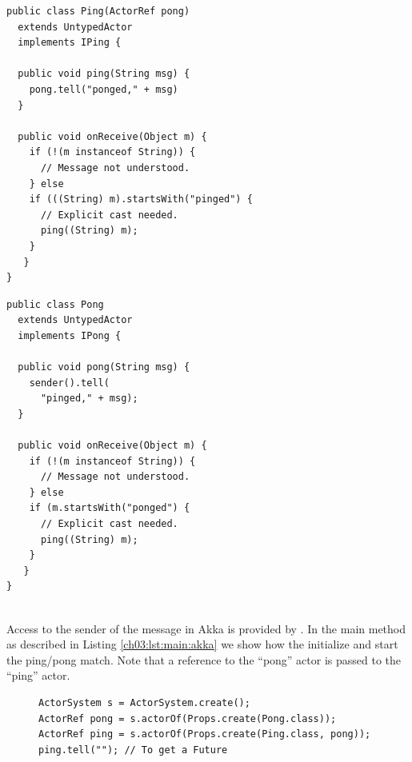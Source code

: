\lstset{language=Java}
\begin{center}
\begin{minipage}[t]{0.48\textwidth}
\begin{lstlisting}[caption=Ping actor in Akka,label=ch03:lst:ping:akka]
public class Ping(ActorRef pong)
  extends UntypedActor 
  implements IPing {

  public void ping(String msg) {
    pong.tell("ponged," + msg)
  }

  public void onReceive(Object m) {
    if (!(m instanceof String)) {
      // Message not understood.
    } else 
    if (((String) m).startsWith("pinged") {
      // Explicit cast needed.
      ping((String) m);
    } 
   }
}
\end{lstlisting}
\end{minipage}
\hfill
\begin{minipage}[t]{0.48\textwidth}
\begin{lstlisting}[caption=Pong class in Akka,label=ch03:lst:pong:akka]
public class Pong 
  extends UntypedActor 
  implements IPong {

  public void pong(String msg) {
    sender().tell(
      "pinged," + msg); 
  }

  public void onReceive(Object m) {
    if (!(m instanceof String)) {
      // Message not understood.
    } else 
    if (m.startsWith("ponged") {
      // Explicit cast needed.
      ping((String) m);
    } 
   }
}
 
\end{lstlisting}
\end{minipage}
\end{center}

Access to the sender of the message in Akka is provided by .
In the main method as described in Listing \ref{ch03:lst:main:akka} we show how the initialize and start the ping/pong match.
Note that a reference to the ``pong'' actor is passed to the ``ping'' actor.

\begin{figure}[h]
\begin{lstlisting}[caption=main in Akka,label=ch03:lst:main:akka]
ActorSystem s = ActorSystem.create();
ActorRef pong = s.actorOf(Props.create(Pong.class));
ActorRef ping = s.actorOf(Props.create(Ping.class, pong));
ping.tell(""); // To get a Future
\end{lstlisting}
\end{figure}

